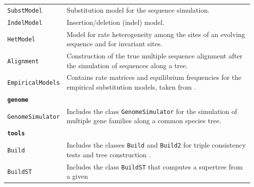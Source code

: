 \documentclass[hidelinks,11pt]{article}
\begin{document}
{\begin{longtable}{| p{4.0cm} | p{10cm} |}
	\texttt{SubstModel} &
	Substitution model for the sequence simulation. \\
	\texttt{IndelModel} &
	Insertion/deletion (indel) model. \\
	\texttt{HetModel} &
	Model for rate heterogeneity among the sites of an evolving sequence and for invariant sites. \\
	\texttt{Alignment} &
	Construction of the true multiple sequence alignment after the simulation of sequences along a tree. \\
	\texttt{EmpiricalModels} &
	Contains rate matrices and equilibrium frequencies for the empirical 
	substitution models, taken from \citep{criscuolo}. \\
  \hline
  \multicolumn{2}{|l|}{\textbf{\texttt{genome}}}\\
  \hline
  \texttt{GenomeSimulator} &
  Includes the class \texttt{GenomeSimulator} for the simulation of multiple 
  gene families along a common species tree. \\
	\hline
	\multicolumn{2}{|l|}{\textbf{\texttt{tools}}}\\
	\hline
  \texttt{Build} &
  Includes the classes \texttt{Build} and \texttt{Build2} for triple 
  consistency tests and tree construction \citep{aho1981, he2006}. \\
	\texttt{BuildST} &
	Includes the class \texttt{BuildST} that computes a supertree from a given 

\end{longtable}}
\end{document}
